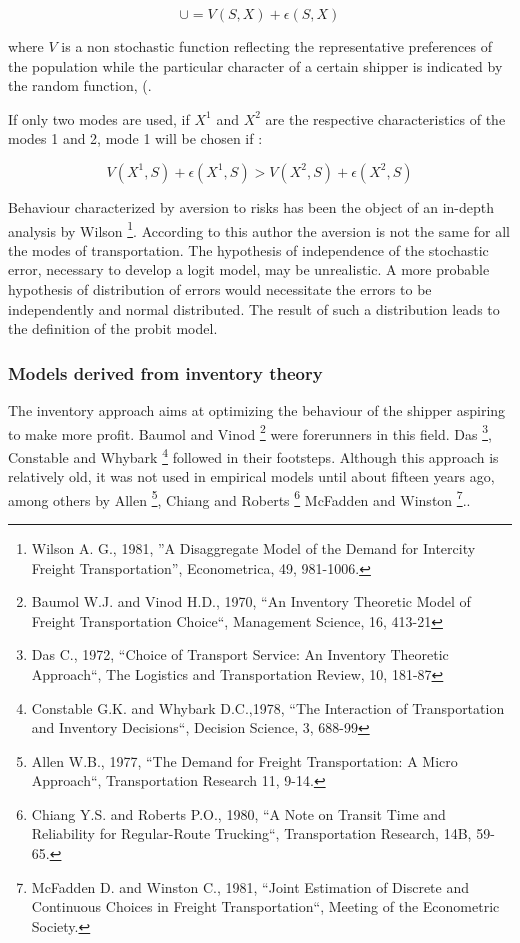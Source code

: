 $$\cup =V(S,X)+\epsilon (S,X)$$

where $V$ is a non stochastic function reflecting the representative preferences of
the population while the particular character of a certain shipper is
indicated by the random function, (.

If only two modes are used, if $X^1$ and $X^2$ are the respective characteristics
of the modes 1 and 2, mode 1 will be chosen if :

$$V(X^1,S)+\epsilon (X^1,S) > V(X^2,S) + \epsilon (X^2,S)$$

Behaviour characterized by aversion to risks has been the object of an in-depth
analysis by Wilson \footnote{Wilson A. G., 1981, ''A Disaggregate Model of the
Demand for Intercity Freight Transportation'', Econometrica, 49, 981-1006.}.
According to this author the aversion is not the same for all the modes of
transportation.  The hypothesis of independence of the stochastic error,
necessary to develop a logit model, may be unrealistic.  A more probable
hypothesis of distribution of errors would necessitate the errors to be
independently and normal distributed. The
result of such a distribution leads to the definition of the probit model.




\subsubsection{Models derived from inventory theory }


The inventory approach aims at optimizing the behaviour of the
shipper aspiring to make more profit.  Baumol and Vinod \footnote {Baumol W.J.
and Vinod H.D., 1970, ``An Inventory Theoretic Model of Freight Transportation
Choice``, Management Science, 16, 413-21} were forerunners in this field.  Das
\footnote {Das C., 1972, ``Choice of Transport Service: An Inventory Theoretic
Approach``, The Logistics and Transportation Review, 10, 181-87}, Constable and
Whybark \footnote {Constable G.K. and Whybark D.C.,1978, ``The Interaction of
Transportation and Inventory Decisions``, Decision Science, 3, 688-99} followed
in their footsteps.  Although this approach is relatively old, it was not used
in empirical models until about fifteen years ago, among others by Allen
\footnote {Allen W.B., 1977, ``The Demand for Freight Transportation: A Micro
Approach``, Transportation Research 11, 9-14.}, Chiang and Roberts
\footnote {Chiang Y.S. and Roberts P.O., 1980, ``A Note on Transit Time and
Reliability for Regular-Route Trucking``, Transportation Research, 14B, 59-65.}
McFadden and Winston \footnote {McFadden D. and Winston C., 1981, ``Joint
Estimation of Discrete and Continuous Choices in Freight Transportation``,
Meeting of the Econometric Society.}..




